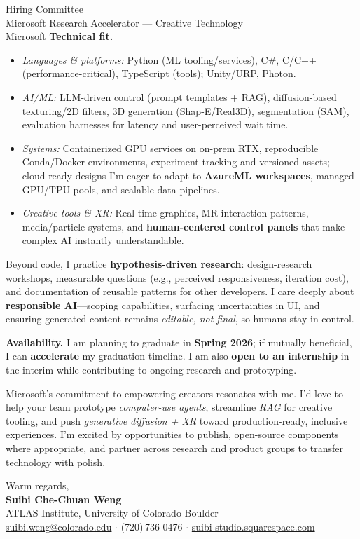 \documentclass[11pt]{letter}
\begin{document}
\begin{letter}{Hiring Committee\\Microsoft Research Accelerator --- Creative Technology\\Microsoft}
\textbf{Technical fit.}
\begin{itemize}
  \item \emph{Languages \& platforms:} Python (ML tooling/services), C\#, C/C++ (performance-critical), TypeScript (tools); Unity/URP, Photon.
  \item \emph{AI/ML:} LLM-driven control (prompt templates + RAG), diffusion-based texturing/2D filters, 3D generation (Shap-E/Real3D), segmentation (SAM), evaluation harnesses for latency and user-perceived wait time.
  \item \emph{Systems:} Containerized GPU services on on-prem RTX, reproducible Conda/Docker environments, experiment tracking and versioned assets; cloud-ready designs I’m eager to adapt to \textbf{AzureML workspaces}, managed GPU/TPU pools, and scalable data pipelines.
  \item \emph{Creative tools \& XR:} Real-time graphics, MR interaction patterns, media/particle systems, and \textbf{human-centered control panels} that make complex AI instantly understandable.
\end{itemize}

Beyond code, I practice \textbf{hypothesis-driven research}: design-research workshops, measurable questions (e.g., perceived responsiveness, iteration cost), and documentation of reusable patterns for other developers. I care deeply about \textbf{responsible AI}---scoping capabilities, surfacing uncertainties in UI, and ensuring generated content remains \emph{editable, not final}, so humans stay in control.

\textbf{Availability.} I am planning to graduate in \textbf{Spring 2026}; if mutually beneficial, I can \textbf{accelerate} my graduation timeline. I am also \textbf{open to an internship} in the interim while contributing to ongoing research and prototyping.

Microsoft’s commitment to empowering creators resonates with me. I’d love to help your team prototype \emph{computer-use agents}, streamline \emph{RAG} for creative tooling, and push \emph{generative diffusion + XR} toward production-ready, inclusive experiences. I’m excited by opportunities to publish, open-source components where appropriate, and partner across research and product groups to transfer technology with polish.

\closing{Warm regards,\\[0.5ex]\textbf{Suibi Che-Chuan Weng}\\ATLAS Institute, University of Colorado Boulder\\\href{mailto:suibi.weng@colorado.edu}{suibi.weng@colorado.edu} \quad $\cdot$ \quad (720)\,736-0476 \quad $\cdot$ \quad \href{https://suibi-studio.squarespace.com}{suibi-studio.squarespace.com}}

\end{letter}
\end{document}
